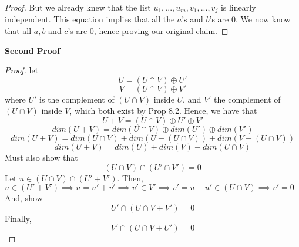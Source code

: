 \documentclass[12pt]{article}
\theoremstyle{definition}
\theoremstyle{remark}
\begin{document}
\begin{proposition}
\begin{proof}
            But we already knew that the list $u_1,...,u_m,v_1,...,v_j$ is linearly independent. 
            This equation implies that all the $a$'s and $b$'s are $0$. We now know that all 
            $a,b$ and $c$'s are $0$, hence proving our original claim.
        \end{proof}
        \textbf{Second Proof}
        \begin{proof}
            let $$U=(U\cap V)\oplus U'$$ $$V=(U\cap V)\oplus V'$$ where $U'$ is the complement 
            of $(U\cap V)$ inside $U$, and $V'$ the complement of $(U\cap V)$ inside $V$, which both
            exist by Prop 8.2. Hence, we have that 
            $$U+V = (U\cap V)\oplus U' \oplus V'$$
            $$dim(U+V) = dim(U\cap V)\oplus dim(U') \oplus dim(V')$$
            $$dim(U+V) = dim(U\cap V) + dim(U-(U\cap V)) + dim(V-(U\cap V))$$
            $$dim(U+V) =  dim(U) + dim(V)-dim(U\cap V)$$
            Must also show that $$(U\cap V) \cap (U'\cap V') = 0$$
            Let $u\in (U\cap V)\cap(U'+V')$. Then, $u\in (U'+V')\implies u=u'+v'\implies v'\in V' \implies v'=u-u' \in (U\cap V)\implies v'=0$
            \newline 
            And, show $$U'\cap (U\cap V+V') = 0$$
            Finally, $$V'\cap (U\cap V+U') = 0$$
        \end{proof}
    \end{proposition}
\end{document}
